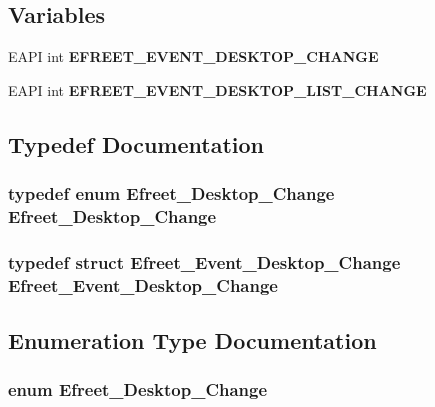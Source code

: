 \subsection*{Variables}
\begin{CompactItemize}
\item 
EAPI int {\bf EFREET\_\-EVENT\_\-DESKTOP\_\-CHANGE}
\item 
EAPI int {\bf EFREET\_\-EVENT\_\-DESKTOP\_\-LIST\_\-CHANGE}
\end{CompactItemize}


\subsection{Typedef Documentation}
\subsubsection[Efreet\_\-Desktop\_\-Change]{\setlength{\rightskip}{0pt plus 5cm}typedef enum {\bf Efreet\_\-Desktop\_\-Change} {\bf Efreet\_\-Desktop\_\-Change}}\label{efreet__utils_8h_4fe5a6524799731bb9fe6a406670b323}


\subsubsection[Efreet\_\-Event\_\-Desktop\_\-Change]{\setlength{\rightskip}{0pt plus 5cm}typedef struct {\bf Efreet\_\-Event\_\-Desktop\_\-Change} {\bf Efreet\_\-Event\_\-Desktop\_\-Change}}\label{efreet__utils_8h_dc0b2a76eebbeb6964214a6ace07b9c0}




\subsection{Enumeration Type Documentation}
\subsubsection[Efreet\_\-Desktop\_\-Change]{\setlength{\rightskip}{0pt plus 5cm}enum {\bf Efreet\_\-Desktop\_\-Change}}\label{efreet__utils_8h_1e4852519eb3ddbb6709d1f01e3b3989}


